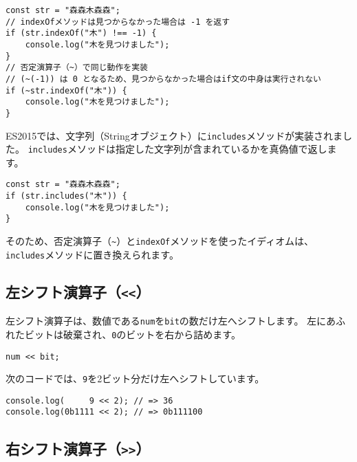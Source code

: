 \begin{lstlisting}
const str = "森森木森森";
// indexOfメソッドは見つからなかった場合は -1 を返す
if (str.indexOf("木") !== -1) {
    console.log("木を見つけました");
}
// 否定演算子（~）で同じ動作を実装
// (~(-1)) は 0 となるため、見つからなかった場合はif文の中身は実行されない
if (~str.indexOf("木")) {
    console.log("木を見つけました");
}
\end{lstlisting}

ES2015では、文字列（Stringオブジェクト）に\texttt{includes}メソッドが実装されました。
\texttt{includes}メソッドは指定した文字列が含まれているかを真偽値で返します。

\begin{lstlisting}
const str = "森森木森森";
if (str.includes("木")) {
    console.log("木を見つけました");
}
\end{lstlisting}

そのため、否定演算子（\lstinline{~}）と\texttt{indexOf}メソッドを使ったイディオムは、\texttt{includes}メソッドに置き換えられます。

\hypertarget{left-shift}{%
\subsection{\texorpdfstring{左シフト演算子（\texttt{\textless{}\textless{}}）}{左シフト演算子（\textless{}\textless{}）}}\label{left-shift}}

左シフト演算子は、数値である\texttt{num}を\texttt{bit}の数だけ左へシフトします。
左にあふれたビットは破棄され、\texttt{0}のビットを右から詰めます。

\begin{lstlisting}
num << bit;
\end{lstlisting}

次のコードでは、\texttt{9}を2ビット分だけ左へシフトしています。

\begin{lstlisting}
console.log(     9 << 2); // => 36
console.log(0b1111 << 2); // => 0b111100
\end{lstlisting}

\hypertarget{right-shift}{%
\subsection{\texorpdfstring{右シフト演算子（\texttt{\textgreater{}\textgreater{}}）}{右シフト演算子（\textgreater{}\textgreater{}）}}\label{right-shift}}

